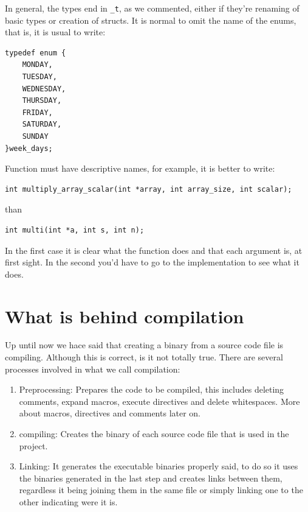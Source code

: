 \documentclass[a4paper]{article}
\begin{document}
In general, the types end in \verb!_t!, as we commented, either if they're
renaming of basic types or creation of structs. It is normal to omit the name
of the enums, that is, it is usual to write:

\noindent
\begin{minipage}[H]{\linewidth}
\mbox{}
\begin{lstlisting}[style=C,
caption={Example of a enum with typedef},
label={lst:typedefEnum}]
typedef enum {
    MONDAY,
    TUESDAY,
    WEDNESDAY,
    THURSDAY,
    FRIDAY,
    SATURDAY,
    SUNDAY
}week_days;
\end{lstlisting}
\end{minipage}

Function must have descriptive names, for example, it is better to write:

\noindent
\begin{minipage}[H]{\linewidth}
\mbox{}
\begin{lstlisting}[style=C,
caption={Example of descriptive function},
label={lst:descriptiveFunction}]
int multiply_array_scalar(int *array, int array_size, int scalar);
\end{lstlisting}
\end{minipage}

than

\noindent
\begin{minipage}[H]{\linewidth}
\mbox{}
\begin{lstlisting}[style=C,
caption={Example of non-descriptive function},
label={lst:nonDescriptiveFunction}]
int multi(int *a, int s, int n);
\end{lstlisting}
\end{minipage}

In the first case it is clear what the function does and that each argument is,
at first sight. In the second you'd have to go to the implementation to see what
it does.

\section{What is behind compilation}
Up until now we hace said that creating a binary from a source code file is
compiling. Although this is correct, is it not totally true. There are several
processes involved in what we call compilation:
\begin{enumerate}
\item Preprocessing: Prepares the code to be compiled, this includes deleting
comments, expand macros, execute directives and delete whitespaces. More about
macros, directives and comments later on.
\item compiling: Creates the binary of each source code file that is used in
the project.
\item Linking: It generates the executable binaries properly said, to do so it
uses the binaries generated in the last step and creates links between them,
regardless it being joining them in the same file or simply linking one to the
other indicating were it is.
\end{enumerate}
\end{document}
